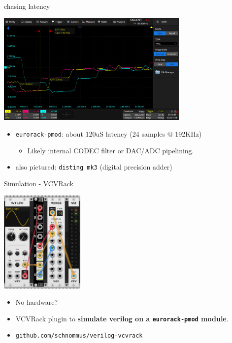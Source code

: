 \documentclass{beamer}
\begin{document}
\begin{frame}{chasing latency}


    \begin{center}
        \includegraphics[height=5.5cm]{img/latency_scope1.png}
    \end{center}

    \begin{itemize}
        \item \texttt{eurorack-pmod}: about 120uS latency (24 samples @ 192KHz)
        \begin{itemize}
            \item Likely internal CODEC filter or DAC/ADC pipelining.
        \end{itemize}
        \item also pictured: \texttt{disting mk3} (digital precision adder)
    \end{itemize}

\end{frame}

\begin{frame}{Simulation - VCVRack}

    \begin{center}
        \includegraphics[height=5cm]{img/vcvrack.png}
    \end{center}

    \begin{itemize}
        \item No hardware?
        \item VCVRack plugin to \textbf{simulate verilog on a \texttt{eurorack-pmod} module}.
        \item \texttt{github.com/schnommus/verilog-vcvrack}
    \end{itemize}

\end{frame}
\end{document}

